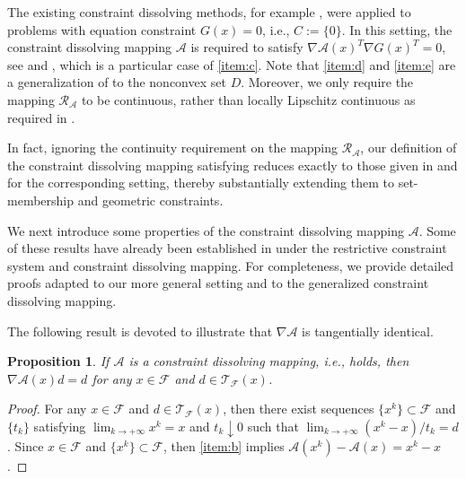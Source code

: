 \documentclass[11pt,a4paper,reqno]{amsart}
\newtheorem{proposition}[theorem]{Proposition}
\begin{document}
{The existing constraint dissolving methods, for example \cite{xiao2024dissolving,xiao2026exact}, were applied to problems with equation constraint $G(x)=0$, i.e., $C:=\{0\}$. In this setting, the constraint dissolving mapping $\mathcal A$ is required to satisfy $\nabla \mathcal A(x)^T\nabla G(x)^T=0$, see \cite[Assumption~1.2]{xiao2024dissolving} and \cite[Assumption~1.2.2]{xiao2026exact}, which is a particular case of \ref{item:c}. Note that \ref{item:d} and \ref{item:e} are a generalization of \cite[Assumption~1.2.3]{xiao2026exact} to the nonconvex set $D$. Moreover, we only require the mapping $\mathcal R_{\mathcal A}$ to be continuous, rather than locally Lipschitz continuous as required in \cite[Assumption~1.2.3]{xiao2026exact}. 

In fact, ignoring the continuity requirement on the mapping $\mathcal R_{\mathcal A}$, our definition of the constraint dissolving mapping satisfying  reduces exactly to those given in \cite[Assumption~1.2]{xiao2024dissolving} and \cite[Assumption~1.2]{xiao2026exact} for the corresponding setting, thereby substantially extending them to set-membership and geometric constraints.

We next introduce some properties of the constraint dissolving mapping $\mathcal A$. Some of these results have already been established in \cite{xiao2026exact} under the restrictive constraint system and constraint dissolving mapping. For completeness, we provide detailed proofs adapted to our more general setting and to the generalized constraint dissolving mapping.

The following result is devoted to illustrate that $\nabla \mathcal A$ is tangentially identical.
\begin{proposition}\label{Prop:1}
If $\mathcal A$ is a constraint dissolving mapping, i.e.,  holds,  then $\nabla \mathcal A (x) d=d$ for any $x\in \mathcal F$ and $d\in \mathcal T_{\mathcal F}(x)$.
\end{proposition}
\begin{proof}
For any $x\in \mathcal F$ and $d\in \mathcal T_{\mathcal F}(x)$, then there exist sequences $\{x^k\}\subset \mathcal F$ and $\{t_k\}$ satisfying $\lim_{k\to +\infty} x^k=x$ and $t_k \downarrow 0$ such that $ \lim_{k \to +\infty} {(x^k-x)}/{t_k}=d $.
Since $x\in \mathcal F$ and $\{x^k\}\subset \mathcal F$, then  \ref{item:b} implies $\mathcal A(x^k)-\mathcal A (x) = x^k-x$.


\end{proof}}
\end{document}
